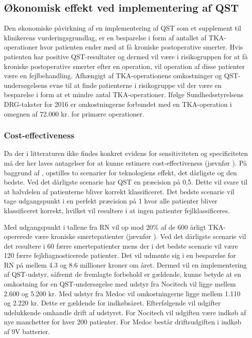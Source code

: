 \subsection{Økonomisk effekt ved implementering af QST}
Den økonomiske påvirkning af en implementering af QST som et supplement til klinikerens vurderingsgrundlag, er en besparelse i form af antallet af TKA-operationer hvor patienten ender med at få kroniske postoperative smerter. Hvis patienten har positive QST-resultater og dermed vil være i risikogruppen for at få kroniske postoperative smerter efter en operation, vil operation af disse patienter være en fejlbehandling. Afhængigt af TKA-operationens omkostninger og QST-undersøgelsens evne til at finde patienterne i risikogruppe vil der være en besparelse i form at et mindre antal TKA-operationer. Ifølge Sundhedsstyrelsens DRG-takster for 2016 er omkostningerne forbundet med en TKA-operation i omegnen af 72.000 kr. for primære operationer. \citep{Takst2016}

\subsubsection{Cost-effectiveness}
Da der i litteraturen ikke findes konkret evidens for sensitiviteten og specificiteten må der her laves antagelser for at kunne estimere cost-effectiveness (jævnfør ). På baggrund af , opstilles to scenarier for teknologiens effekt, det dårligste og den bedste. Ved det dårligste scenarie har QST en præcision på 0,5. Dette vil svare til at halvdelen af patienterne bliver korrekt klassificeret. Det bedste scenarie vil tage udgangspunkt i en perfekt præcision på 1 hvor alle patienter bliver klassificeret korrekt, hvilket vil resultere i at ingen patienter fejlklassificeres.  

Med udgangspunkt i tallene fra RN vil op mod 20\% af de 600 årligt TKA-opererede være kroniske smertepatienter (jævnfør ). Ved det dårligste scenarie vil det resultere i 60 færre smertepatienter mens der i det bedste scenarie vil være 120 færre fejldiagnosticerede patienter. Det vil udmønte sig i en besparelse for RN på mellem 4.3 og 8.6 millioner kroner om året. Dermed vil en implementering af QST-udstyr, såfremt de fremlagte forbehold er gældende, kunne betyde at en omkostning for en QST-undersøgelse med udstyr fra Nocitech vil ligge mellem 2.600 og 5.200 kr. Med udstyr fra Medoc vil omkostningerne ligge mellem 1.110 og 2.220 kr. Dette er gældende for indkøbsåret. Efterfølgende vil udgifter udelukkende omhandle drift af udstyret. For Nocitech vil udgiften være indkøb af nye manchetter for hver 200 patienter. For Medoc består driftsudgiften i indkøb af 9V batterier. 

